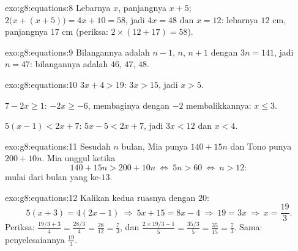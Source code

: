 \begin{solution}{exo:g8:equations:8}
Lebarnya $x$, panjangnya $x + 5$; 
$2\bigl(x + (x + 5)\bigr) = 4x + 10 = 58$, jadi $4x = 48$ dan
$x = 12$: lebarnya $12$ cm, panjangnya $17$ cm (periksa:
$2 \times (12 + 17) = 58$).
\end{solution}

\begin{solution}{exo:g8:equations:9}
Bilangannya adalah $n - 1$, $n$, $n + 1$ dengan  $3n = 141$,
jadi $n = 47$: bilangannya adalah $46$, $47$, $48$.
\end{solution}

\begin{solution}{exo:g8:equations:10}
$3x + 4 > 19$: $3x > 15$, jadi $x > 5$.

$7 - 2x \geq 1$: $-2x \geq -6$, membaginya dengan $-2$ membalikkannya:
$x \leq 3$.

$5(x-1) < 2x + 7$: $5x - 5 < 2x + 7$, jadi $3x < 12$ dan $x < 4$.
\end{solution}

\begin{solution}{exo:g8:equations:11}
Sesudah $n$ bulan, Mia punya $140 + 15n$ dan Tono punya
$200 + 10n$. Mia unggul ketika
\[
140 + 15n > 200 + 10n
\ \Longleftrightarrow\
5n > 60
\ \Longleftrightarrow\
n > 12 :
\]
mulai dari bulan yang ke-$13$.
\end{solution}

\begin{solution}{exo:g8:equations:12}
Kalikan kedua ruasnya dengan $20$:
\[
5(x + 3) = 4(2x - 1)
\ \Longrightarrow\
5x + 15 = 8x - 4
\ \Longrightarrow\
19 = 3x
\ \Longrightarrow\
x = \frac{19}{3}.
\]
Periksa: $\frac{19/3 + 3}{4} = \frac{28/3}{4} = \frac{28}{12} =
\frac73$, dan $\frac{2 \times 19/3 - 1}{5} = \frac{35/3}{5} =
\frac{35}{15} = \frac73$. Sama: penyelesaiannya $\frac{19}{3}$.
\end{solution}

